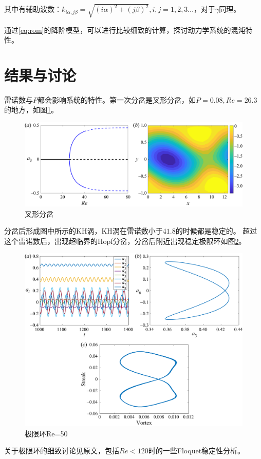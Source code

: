 \documentclass[UTF8,zihao=5]{ctexart} %
\begin{document}
其中有辅助波数：$k_{i\alpha,j\beta } = \sqrt {(i\alpha) ^2+(j\beta) ^2}, i,j=1,2,3...$，对于$\gamma$同理。

通过\eqref{eq:rom}的降阶模型，可以进行比较细致的计算，探讨动力学系统的混沌特性。

\section{结果与讨论}

雷诺数与$P$都会影响系统的特性。第一次分岔是叉形分岔，如$P=0.08, Re=26.3$的地方，如图\ref{fig:pitchfork}。

\begin{figure}[H]
    \centering
    \includegraphics[width=12cm]{pitchfork.png}  %
    \caption{叉形分岔}
    \label{fig:pitchfork}
\end{figure}
分岔后形成图中所示的KH涡，KH涡在雷诺数小于$41.8$的时候都是稳定的。
超过这个雷诺数后，出现超临界的Hopf分岔，分岔后附近出现稳定极限环如图\ref{fig:limitcycle}。
\begin{figure}[H]
    \centering
    \includegraphics[width=12cm]{limcycle.png}  %
    \caption{极限环Re=50}
    \label{fig:limitcycle}
\end{figure}
关于极限环的细致讨论见原文，包括$Re<120$时的一些Floquet稳定性分析。
\end{document}
